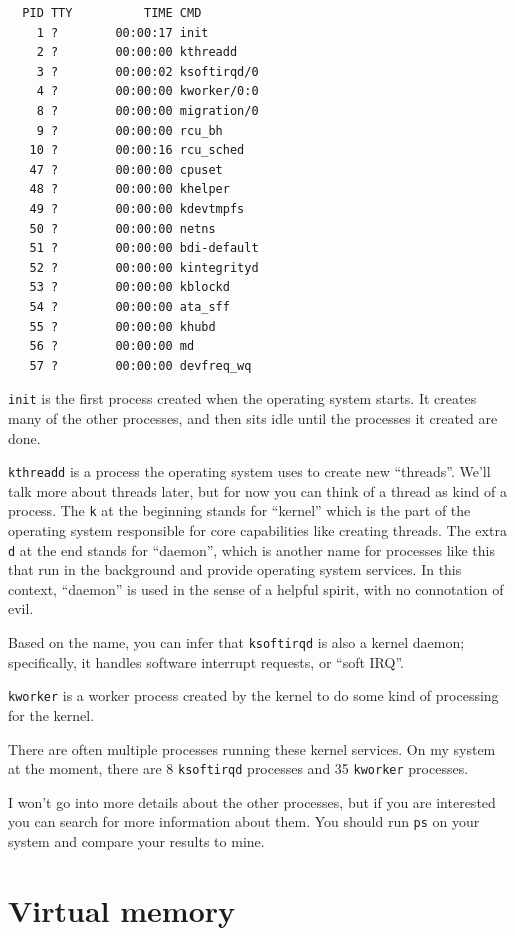 \documentclass[12pt]{book}
\begin{document}
\begin{verbatim}
  PID TTY          TIME CMD
    1 ?        00:00:17 init
    2 ?        00:00:00 kthreadd
    3 ?        00:00:02 ksoftirqd/0
    4 ?        00:00:00 kworker/0:0
    8 ?        00:00:00 migration/0
    9 ?        00:00:00 rcu_bh
   10 ?        00:00:16 rcu_sched
   47 ?        00:00:00 cpuset
   48 ?        00:00:00 khelper
   49 ?        00:00:00 kdevtmpfs
   50 ?        00:00:00 netns
   51 ?        00:00:00 bdi-default
   52 ?        00:00:00 kintegrityd
   53 ?        00:00:00 kblockd
   54 ?        00:00:00 ata_sff
   55 ?        00:00:00 khubd
   56 ?        00:00:00 md
   57 ?        00:00:00 devfreq_wq
\end{verbatim}

{\tt init} is the first process created when the operating system
starts.  It creates many of the other processes, and then sits idle
until the processes it created are done.

{\tt kthreadd} is a process the operating system uses to create new
``threads''.  We'll talk more about threads later, but for now you can
think of a thread as kind of a process.  The {\tt k} at the beginning
stands for ``kernel'' which is the part of the operating system
responsible for core capabilities like creating threads.  The extra
{\tt d} at the end stands for ``daemon'', which is another name for
processes like this that run in the background and provide operating
system services.  In this context, ``daemon'' is used in the
sense of a helpful spirit, with no connotation of evil.

Based on the name, you can infer that {\tt ksoftirqd} is also a kernel
daemon; specifically, it handles software interrupt requests, or
``soft IRQ''.

{\tt kworker} is a worker process created by the kernel to do some
kind of processing for the kernel.

There are often multiple processes running these kernel services.
On my system at the moment, there are 8 {\tt ksoftirqd} processes
and 35 {\tt kworker} processes.

I won't go into more details about the other processes, but if you
are interested you can search for more information about them.
You should run {\tt ps} on your system and compare your results
to mine.



\chapter{Virtual memory}
\end{document}
